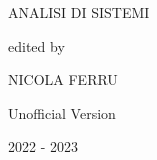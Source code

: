 \begin{titlepage}
\begin{center}
		\Huge \doublespacing \bfseries \begin{spacing}{1}{ANALISI DI SISTEMI}\end{spacing}
		\hfill
		\normalsize \itshape \begin{spacing}{1}{}\end{spacing}
		\hfill
		\normalsize\itshape \begin{spacing}{1}{edited by}\end{spacing}
		\hfill
		\Large\itshape  \begin{spacing}{1}{NICOLA FERRU}\end{spacing}
		\vspace{0.5cm}
		
		\hfill
		\vfill
		\Large \bfseries \begin{spacing}{1}{Unofficial Version}\end{spacing}
		\vspace{0.5cm}
		{\small 2022 -  2023}
	\end{center}
	\clearpage
	\thispagestyle{empty}
	\vspace*{\fill}%
	{\par}%
	\vspace{\fill}
\end{titlepage}